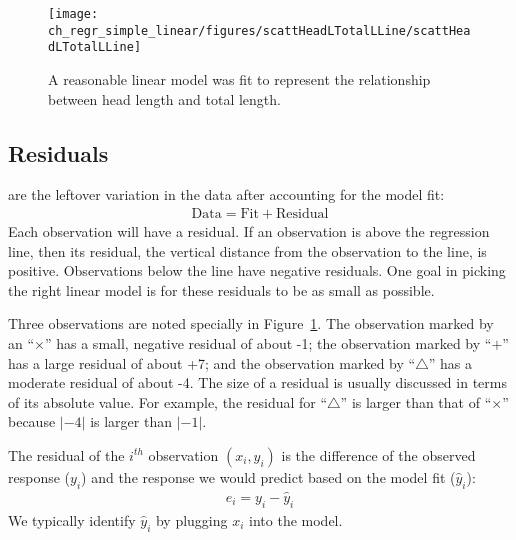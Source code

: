 \begin{figure}
   \centering
   \texttt{[image: ch\_regr\_simple\_linear/figures/scattHeadLTotalLLine/scattHeadLTotalLLine]}
   \caption{A reasonable linear model was fit to represent the relationship between head length and total length.}
   \label{scattHeadLTotalLLine}
\end{figure}

\subsection{Residuals}


 are the leftover variation in the data after accounting for the model fit:
\begin{align*}
\text{Data} = \text{Fit} + \text{Residual}
\end{align*}
Each observation will have a residual. If an observation is above the regression line, then its residual, the vertical distance from the observation to the line, is positive. Observations below the line have negative residuals. One goal in picking the right linear model is for these residuals to be as small as possible.

Three observations are noted specially in Figure~\ref{scattHeadLTotalLLine}. The observation marked by an ``$\times$'' has a small, negative residual of about -1; the observation marked by ``$+$'' has a large residual of about +7; and the observation marked by ``$\triangle$'' has a moderate residual of about -4. The size of a residual is usually discussed in terms of its absolute value. For example, the residual for ``$\triangle$'' is larger than that of ``$\times$'' because $|-4|$ is larger than $|-1|$.

\begin{termBox}{
The residual of the $i^{th}$ observation $(x_i, y_i)$ is the difference of the observed response ($y_i$) and the response we would predict based on the model fit ($\hat{y}_i$):
\begin{eqnarray*}
e_i = y_i - \hat{y}_i
\end{eqnarray*}
We typically identify $\hat{y}_i$ by plugging $x_i$ into the model.}
\end{termBox}


